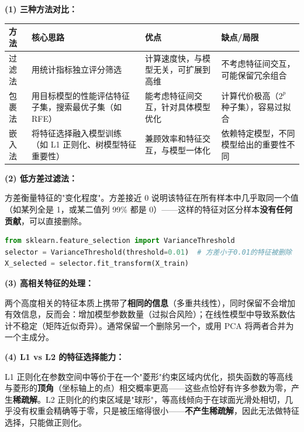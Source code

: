 \documentclass[a4paper,11pt]{ctexart}
\begin{document}
\begin{solutionbox}[参考答案与详细解析]
    \textbf{(1) 三种方法对比：}
    \begin{center}
    \begin{tabular}{p{2.5cm} p{3.5cm} p{3cm} p{3.5cm}}
        \toprule
        方法 & 核心思路 & 优点 & 缺点/局限 \\
        \midrule
        过滤法 & 用统计指标独立评分筛选 & 计算速度快，与模型无关，可扩展到高维 & 不考虑特征间交互，可能保留冗余组合 \\[0.8em]
        包裹法 & 用目标模型的性能评估特征子集，搜索最优子集（如 RFE） & 能考虑特征间交互，针对具体模型优化 & 计算代价极高（$2^p$ 种子集），容易过拟合 \\[0.8em]
        嵌入法 & 将特征选择融入模型训练（如 L1 正则化、树模型特征重要性） & 兼顾效率和特征交互，与模型一体化 & 依赖特定模型，不同模型给出的重要性不同 \\
        \bottomrule
    \end{tabular}
    \end{center}

    \textbf{(2) 低方差过滤法：}

    方差衡量特征的"变化程度"。方差接近 0 说明该特征在所有样本中几乎取同一个值（如某列全是 1，或某二值列 99\% 都是 0）——这样的特征对区分样本\textbf{没有任何贡献}，可以直接删除。

    \begin{lstlisting}[language=Python]
from sklearn.feature_selection import VarianceThreshold
selector = VarianceThreshold(threshold=0.01)  # 方差小于0.01的特征被删除
X_selected = selector.fit_transform(X_train)
    \end{lstlisting}

    \textbf{(3) 高相关特征的处理：}

    两个高度相关的特征本质上携带了\textbf{相同的信息}（多重共线性），同时保留不会增加有效信息，反而会：增加模型参数数量（过拟合风险）；在线性模型中导致系数估计不稳定（矩阵近似奇异）。通常保留一个删除另一个，或用 PCA 将两者合并为一个主成分。

    \textbf{(4) L1 vs L2 的特征选择能力：}

    \begin{keybox}[L1 产生稀疏解的数学原因]
        L1 正则化在参数空间中等价于在一个"菱形"约束区域内优化，损失函数的等高线与菱形的\textbf{顶角}（坐标轴上的点）相交概率更高——这些点恰好有许多参数为零，产生\textbf{稀疏解}。L2 正则化的约束区域是"球形"，等高线倾向于在球面光滑处相切，几乎没有权重会精确等于零，只是被压缩得很小——\textbf{不产生稀疏解}，因此无法做特征选择，只能做正则化。
    \end{keybox}
\end{solutionbox}
\end{document}
